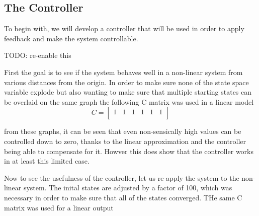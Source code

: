 \subsection{The Controller}
To begin with, we will develop a controller that will be used in order to apply feedback and make the system
controllable.

{\LARGE \color{red} TODO: re-enable this}

First the goal is to see if the system behaves well in a non-linear system from various distances from the
origin.
In order to make sure none of the state space variable explode but also wanting to make sure that multiple
starting states can be overlaid on the same graph the following C matrix was used in a linear model
\begin{equation}
  C =
  \begin{bmatrix}
    1 & 1 & 1 & 1 & 1 & 1 \\
  \end{bmatrix}
\end{equation}


from these graphs, it can be seen that even non-sensically high values can be controlled down to zero, thanks
to the linear approximation and the controller being able to compensate for it. Howver this does show that the
controller works in at least this limited case.

Now to see the usefulness of the controller, let us re-apply the system to the non-linear system. The inital
states are adjusted by a factor of 100, which was necessary in order to make sure that all of the states
converged. THe same C matrix was used for a linear output

